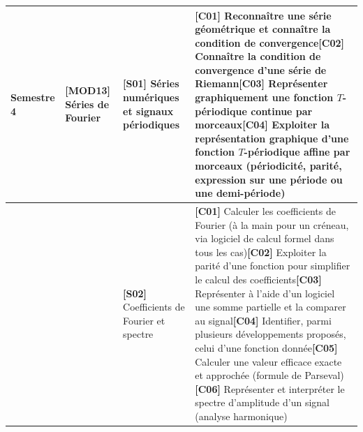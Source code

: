 \documentclass[a4paper,10pt,landscape]{article}
\begin{document}
\begin{longtable}{>{\raggedright\arraybackslash}p{2.2cm} >{\raggedright\arraybackslash}p{3cm} >{\raggedright\arraybackslash}p{3.5cm} >{\raggedright\arraybackslash}p{13.2cm}}
\midrule
\textbf{Semestre 4} & \textbf{[MOD13]} Séries de Fourier & \textbf{[S01]} Séries numériques et signaux périodiques & \textbf{[C01]} Reconnaître une série géométrique et connaître la condition de convergence\newline \textbf{[C02]} Connaître la condition de convergence d'une série de Riemann\newline \textbf{[C03]} Représenter graphiquement une fonction $T$-périodique continue par morceaux\newline \textbf{[C04]} Exploiter la représentation graphique d'une fonction $T$-périodique affine par morceaux (périodicité, parité, expression sur une période ou une demi-période) \\
\cmidrule(l){3-4}
 &  & \textbf{[S02]} Coefficients de Fourier et spectre & \textbf{[C01]} Calculer les coefficients de Fourier (à la main pour un créneau, via logiciel de calcul formel dans tous les cas)\newline \textbf{[C02]} Exploiter la parité d'une fonction pour simplifier le calcul des coefficients\newline \textbf{[C03]} Représenter à l'aide d'un logiciel une somme partielle et la comparer au signal\newline \textbf{[C04]} Identifier, parmi plusieurs développements proposés, celui d'une fonction donnée\newline \textbf{[C05]} Calculer une valeur efficace exacte et approchée (formule de Parseval)\newline \textbf{[C06]} Représenter et interpréter le spectre d'amplitude d'un signal (analyse harmonique) \\
\bottomrule
\end{longtable}
\end{document}
